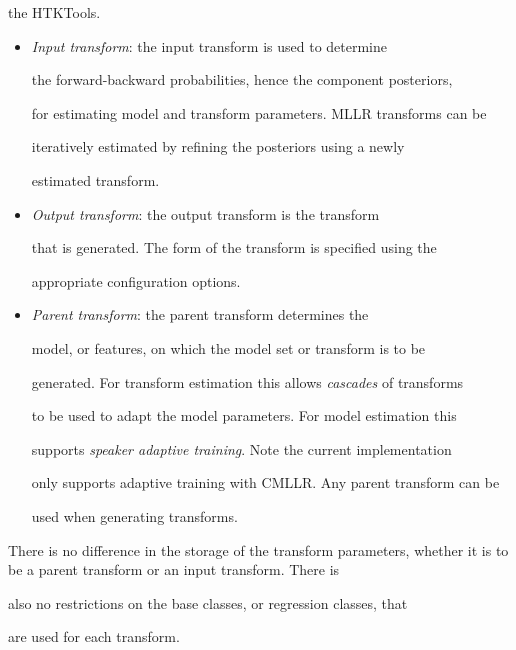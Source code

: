 the HTKTools.


\begin{itemize}





\item {\it Input transform}: the input transform is used to determine


the forward-backward probabilities, hence the component posteriors,


for estimating model and transform parameters. MLLR transforms can be


iteratively estimated by refining the posteriors using a newly


estimated transform.





\item {\it Output transform}: the output transform is the transform


that is generated. The form of the transform is specified using the 


appropriate configuration options.





\item {\it Parent transform}: the parent transform determines the 


model, or features, on which the model set or transform is to be 


generated. For transform estimation this allows {\em cascades} of transforms


to be used to adapt the model parameters. For model estimation this 


supports {\em speaker adaptive training}. Note the current implementation 


only supports adaptive training with CMLLR. Any parent transform can be


used when generating transforms.


\end{itemize}





There is no difference in the storage of the transform parameters, whether it is to be a parent transform or an input transform. There is


also no restrictions on the base classes, or regression classes, that 


are used for each transform.





